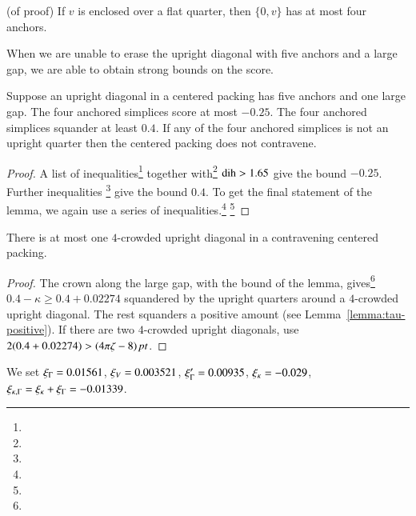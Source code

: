 \begin{corollary} (of proof)
If $v$ is enclosed over a flat quarter, then $\{0,v\}$ has at most four
anchors.
\end{corollary}

When we are unable to erase the upright diagonal with five anchors
and a large gap, we are able to obtain strong bounds on the score.


\begin{lemma}
    \label{lemma:4-crowded}
Suppose an upright diagonal in a centered packing has five anchors
and one large gap. The four anchored simplices score at most
$-0.25$. The four anchored simplices squander at least $0.4$. If
any of the four anchored simplices is not an upright quarter then
the centered packing does not contravene.
\end{lemma}

\begin{proof}
A list of inequalities\footnote{} %
together with\footnote{} %
$\operatorname{dih}>1.65$ give the bound $-0.25$.
Further inequalities \footnote{} %
give the bound $0.4$.  To get the final statement of the lemma, we
again use a series of inequalities.\footnote{} %
\footnote{} %
\end{proof}

\begin{corollary}  There is at most one $4$-crowded upright
diagonal in a contravening centered packing.
\end{corollary}

\begin{proof}  The crown along the large gap,
with the bound of the lemma, gives\footnote{} %
    $0.4-\kappa \ge 0.4+0.02274$
squandered by the upright quarters around a $4$-crowded upright
diagonal. The rest squanders a positive amount (see
Lemma~\ref{lemma:tau-positive}). If there are two $4$-crowded
upright diagonals, use $2(0.4+0.02274)>(4\pi\zeta-8)\,\hbox{\it pt}$.
\end{proof}

\begin{definition}
We set $\xi_\Gamma = 0.01561$, $\xi_V = 0.003521$, $\xi_\Gamma'=0.00935$,
$\xi_\kappa=-0.029$, $\xi_{\kappa,\Gamma} = \xi_\kappa+\xi_\Gamma = -0.01339$.
\end{definition}

